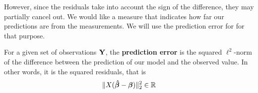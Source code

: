 However, since the residuals take into account the sign of the difference, they may partially cancel out. We would like a measure that indicates how far our predictions are from the measurements. We will use the prediction error for for that purpose.

\begin{definition}
    For a given set of observations \(\mathbf{Y}\), the \textbf{prediction error} is the squared \(\ell^2\)-norm of the difference between the prediction of our model and the observed value. In other words, it is the squared residuals, that is
    \[
        \| X (\boldsymbol{\hat{\beta}} - \boldsymbol{\beta}) \|_2^2 \in \mathbb{R}
    \]
\end{definition}


